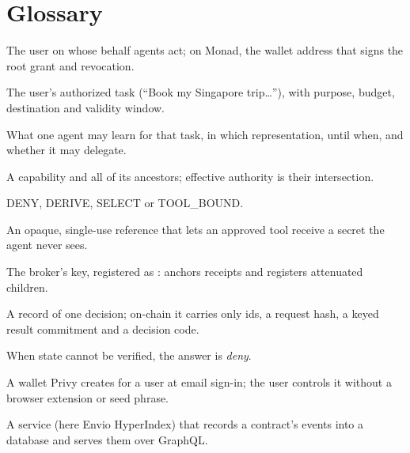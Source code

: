 \documentclass[11pt,a4paper]{article}
\begin{document}
\appendix
\section{Glossary}
\begin{description}[style=nextline,leftmargin=0pt,font=\bfseries\color{indigo}]
  \item[Principal] The user on whose behalf agents act; on Monad, the wallet address that signs the root grant and revocation.
  \item[Task mandate] The user's authorized task (``Book my Singapore trip\ldots''), with purpose, budget, destination and validity window.
  \item[Context capability] What one agent may learn for that task, in which representation, until when, and whether it may delegate.
  \item[Lineage] A capability and all of its ancestors; effective authority is their intersection.
  \item[Disclosure mode] DENY, DERIVE, SELECT or TOOL\_BOUND.
  \item[Tool-bound handle] An opaque, single-use reference that lets an approved tool receive a secret the agent never sees.
  \item[Operator] The broker's key, registered as : anchors receipts and registers attenuated children.
  \item[Receipt] A record of one decision; on-chain it carries only ids, a request hash, a keyed result commitment and a decision code.
  \item[Fail closed] When state cannot be verified, the answer is \emph{deny}.
  \item[Embedded wallet] A wallet Privy creates for a user at email sign-in; the user controls it without a browser extension or seed phrase.
  \item[Indexer] A service (here Envio HyperIndex) that records a contract's events into a database and serves them over GraphQL.
\end{description}
\end{document}
